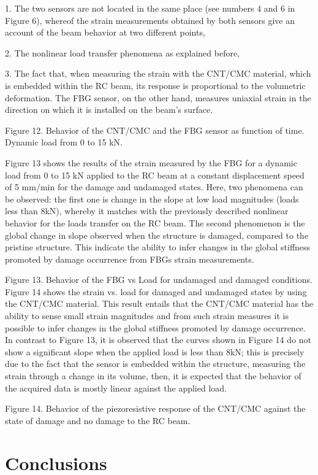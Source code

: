 \documentclass[twocolumn]{bmcart}%
\begin{document}
1. The two sensors are not located in the same place (see numbers 4 and 6 in Figure 6), whereof the strain measurements obtained by both sensors give an account of the beam behavior at two different points,

2. The nonlinear load transfer phenomena as explained before, 

3. The fact that, when measuring the strain with the CNT/CMC material, which is embedded within the RC beam, its response is proportional to the volumetric deformation. The FBG sensor, on the other hand, measures uniaxial strain in the direction on which it is installed on the beam’s surface.

Figure 12. Behavior of the CNT/CMC and the FBG sensor as function of time. Dynamic load from 0 to 15 kN.

Figure 13 shows the results of the strain measured by the FBG for a dynamic load from 0 to 15 kN applied to the RC beam at a constant displacement speed of 5 mm/min for the damage and undamaged states. Here, two phenomena can be observed: the first one is change in the slope at low load magnitudes (loads less than 8kN), whereby it matches with the previously described nonlinear behavior for the loads transfer on the RC beam. The second phenomenon is the global change in slope observed when the structure is damaged, compared to the pristine structure. This indicate the ability to infer changes in the global stiffness promoted by damage occurrence from FBGs strain measurements.

Figure 13. Behavior of the FBG vs Load for undamaged and damaged conditions.
Figure 14 shows the strain vs. load for damaged and undamaged states by using the CNT/CMC material. This result entails that the CNT/CMC material has the ability to sense small strain magnitudes and from such strain measures it is possible to infer changes in the global stiffness promoted by damage occurrence.
In contrast to Figure 13, it is observed that the curves shown in Figure 14 do not show a significant slope when the applied load is less than 8kN; this is precisely due to the fact that the sensor is embedded within the structure, measuring the strain through a change in its volume, then, it is expected that the behavior of the acquired data is mostly linear against the applied load.

Figure 14. Behavior of the piezoresistive response of the CNT/CMC against the state of damage and no damage to the RC beam.

\section*{Conclusions}
\end{document}
